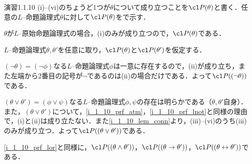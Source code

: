 \begin{excfield}{演習1.1.10}
  (i)--(vi)のちょうど1つが$\theta$について成り立つことを$\cl P (\theta)$と書く．任意の$L$--命題論理式$\theta$に対して$\cl P (\theta)$をで示す．
  \begin{step}
    \item \label{i_1_10_prf_atm}
    $\theta$が$L$--原始命題論理式の場合，(i)のみが成り立つので，$\cl P (\theta)$である．
  \end{step}
  $L$--命題論理式$\theta, \theta'$を任意に取り，$\cl P (\theta)$と$\cl P (\theta')$を仮定する．
  \begin{step}[resume]
    \item \label{i_1_10_prf_lnot}
    $(\lnot \theta) = (\lnot \phi)$なる$L$--命題論理式$\phi$は一意に存在するので，(ii)が成り立ち，また左端から2番目の記号が$\lnot$であるのは(ii)の場合だけである．よって$\cl P ((\lnot \theta))$である．
    \item \label{i_1_10_prf_lor}
    $(\theta \lor \theta') = (\phi \lor \psi)$なる$L$--命題論理式$\phi, \psi$の存在は明らかである（$\theta, \theta'$自身）．また，$(\theta \lor \theta')$について，\ref{i_1_10_prf_atm}，\ref{i_1_10_prf_lnot}と同様の理由で，(i)と(ii)は成り立たない．また\cref{i_1_10_lem_conn}より，(iii)--(vi)のうち(iii)のみが成り立つ．よって$\cl P ((\theta \lor \theta'))$である．
    \item \ref{i_1_10_prf_lor}と同様に，$\cl P ((\theta \land \theta'))$，$\cl P ((\theta \ra \theta'))$，$\cl P ((\theta \lra \theta'))$である．
  \end{step}
\end{excfield}
